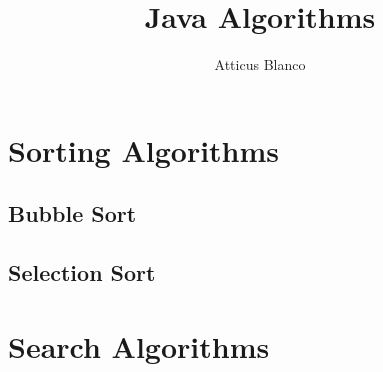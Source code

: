 \documentclass[11pt]{article}
\begin{document}
\title{Java Algorithms}
\author{Atticus Blanco}

\maketitle

    \section{Sorting Algorithms}

        \subsection{Bubble Sort}
            

        \subsection{Selection Sort}

    \section{Search Algorithms}
\end{document}
